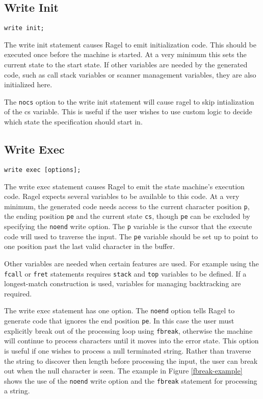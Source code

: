 \documentclass[letterpaper,11pt,oneside]{book}
\newcommand{\verbspace}{\vspace{10pt}}
\begin{document}
\subsection{Write Init}
\begin{verbatim}
write init;
\end{verbatim}
\verbspace

The write init statement causes Ragel to emit initialization code. This should
be executed once before the machine is started. At a very minimum this sets the
current state to the start state. If other variables are needed by the
generated code, such as call stack variables or scanner management
variables, they are also initialized here.

The \verb|nocs| option to the write init statement will cause ragel to skip
intialization of the cs variable. This is useful if the user wishes to use
custom logic to decide which state the specification should start in.

\subsection{Write Exec}
\begin{verbatim}
write exec [options];
\end{verbatim}
\verbspace

The write exec statement causes Ragel to emit the state machine's execution code.
Ragel expects several variables to be available to this code. At a very minimum, the
generated code needs access to the current character position \verb|p|, the ending
position \verb|pe| and the current state \verb|cs|, though \verb|pe|
can be excluded by specifying the \verb|noend| write option.
The \verb|p| variable is the cursor that the execute code will
used to traverse the input. The \verb|pe| variable should be set up to point to one
position past the last valid character in the buffer.

Other variables are needed when certain features are used. For example using
the \verb|fcall| or \verb|fret| statements requires \verb|stack| and
\verb|top| variables to be defined. If a longest-match construction is used,
variables for managing backtracking are required.

The write exec statement has one option. The \verb|noend| option tells Ragel
to generate code that ignores the end position \verb|pe|. In this
case the user must explicitly break out of the processing loop using
\verb|fbreak|, otherwise the machine will continue to process characters until
it moves into the error state. This option is useful if one wishes to process a
null terminated string. Rather than traverse the string to discover then length
before processing the input, the user can break out when the null character is
seen.  The example in Figure \ref{fbreak-example} shows the use of the
\verb|noend| write option and the \verb|fbreak| statement for processing a string.
\end{document}
